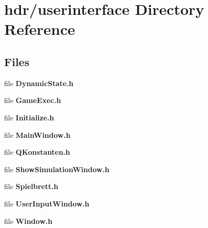 \section{hdr/userinterface Directory Reference}
\label{dir_5cd1f6435bf62c6a6fa20b8fa16990bc}
\subsection*{Files}
\begin{DoxyCompactItemize}
\item 
file {\bfseries Dynamic\-State.\-h}
\item 
file {\bfseries Game\-Exec.\-h}
\item 
file {\bfseries Initialize.\-h}
\item 
file {\bfseries Main\-Window.\-h}
\item 
file {\bfseries Q\-Konstanten.\-h}
\item 
file {\bfseries Show\-Simulation\-Window.\-h}
\item 
file {\bfseries Spielbrett.\-h}
\item 
file {\bfseries User\-Input\-Window.\-h}
\item 
file {\bfseries Window.\-h}
\end{DoxyCompactItemize}
